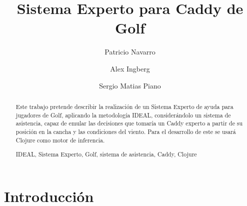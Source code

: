 \documentclass[runningheads,a4paper]{llncs}
\newcommand{\keywords}[1]{\par\addvspace\baselineskip
\noindent\keywordname\enspace\ignorespaces#1}
\begin{document}
\mainmatter  %

\title{Sistema Experto para Caddy de Golf}


%
%
\author{Patricio Navarro\and Alex Ingberg\and Sergio Matias Piano}
%


%
%

\maketitle


\begin{abstract}
Este trabajo pretende describir la realización de un Sistema Experto de ayuda para jugadores de Golf, aplicando la metodología IDEAL, considerándolo un sistema de asistencia, capaz de emular las decisiones que tomaría un Caddy experto a partir de su posición en la cancha  y las condiciones del viento. Para el desarrollo de este se usará Clojure como motor de inferencia.
\keywords{IDEAL, Sistema Experto, Golf, sistema de asistencia, Caddy, Clojure}
\end{abstract}


\section{Introducción}
\end{document}
